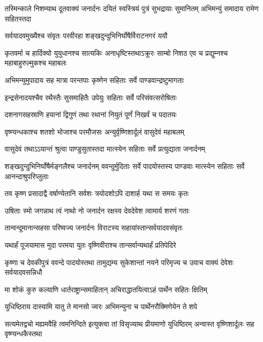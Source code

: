 \threelineshloka
{तस्मिन्काले निशम्याथ दूतवाक्यं जनार्दनः}
{दयितं स्वस्त्रियं पुत्रं सुभद्रायाः सुमानितम्}
{अभिमन्युं समादाय रामेण सहितस्तदा}


\twolineshloka
{सर्वयादवमुख्यैश्च संवृतः परवीरहा}
{शङ्खदुन्दुभिनिर्घोषैर्विराटनगरं ययौ}


\threelineshloka
{कृतवर्मा च हार्दिक्यो युयुधानश्च सात्यकिः}
{अनाधृष्टिस्तथाऽक्रूरः साम्बो निशठ एव च}
{प्रद्युम्नश्च महाबाहुरुल्मुकश्च महाबलः}


\twolineshloka
{अभिमन्युमुपादाय सह मात्रा परन्तपाः}
{कृष्णेन सहिताः सर्वे पाण्डवान्द्रष्टुमागताः}


\twolineshloka
{इन्द्रसेनादयश्चैव रथैस्तैः सुसमाहितैः}
{उपेयुः सहिताः सर्वे परिसंवत्सरोषिताः}


\twolineshloka
{दशनागसहस्राणि हयानां द्विगुणं तथा}
{रथानां नियुतं पूर्णं निखर्वं च पदातयः}


\twolineshloka
{वृष्ण्यन्धकाश्च शतशो भोजाश्च परमौजसः}
{अन्युर्वृष्णिशार्दूलं वासुदेवं महाबलम्}


\twolineshloka
{वासुदेवं तथाऽऽयान्तं श्रुत्वा पाण्डुसुतास्तदा}
{मात्स्येन सहिताः सर्वे प्रत्युद्याता जनार्दनम्}


\threelineshloka
{शङ्खदुन्दुभिनिर्घोषैर्मङ्गलैश्च जनार्दनम्}
{ववन्दुर्मुदिताः सर्वे पादयोस्तस्य पाण्डवाः}
{मात्स्येन सहिताः सर्वे आनन्दाश्रुपरिप्लुताः}


\twolineshloka
{तव कृष्ण प्रसादाद्वै वर्षाण्येतानि सर्वशः}
{त्रयोदशोऽपि दाशार्ह यथा स समयः कृतः}


\twolineshloka
{उषिताः स्मो जगन्नाथ त्वं नाथो नो जनार्दन}
{रक्षस्व देवदेवेश त्वामार्य शरणं गताः}



\twolineshloka
{तान्वन्दूमानान्सहसा परिष्वज्य जनार्दनः}
{विराटस्य सहायांस्तान्सर्वयादवसंवृतः}


\twolineshloka
{यथार्हं पूजयामास मुदा परमया युतः}
{वृष्णिवीराश्च तान्सर्वान्यथार्हं प्रतिपेदिरे}


\threelineshloka
{कृष्णा च देवकीपुत्रं ववन्दे पादयोस्तथा}
{तामुद्यम्य सुकेशान्तां नयने परिमृज्य च}
{उवाच वाक्यं देवेशः सर्वयादवसन्निधौ}


\twolineshloka
{मा शोकं कुरु कल्याणि धार्तराष्ट्रान्समाहितान्}
{अचिराद्धातयित्वाऽहं पार्थेन सहितः क्षितिम्}


\twolineshloka
{युधिष्ठिराय दास्यामि यातु ते मानसो ज्वरः}
{अभिमन्युना च पार्थेनरौक्मिणेयेन ते शपे}


\threelineshloka
{सत्यमेतद्वचो मह्यमवैहि त्वमनिन्दिते}
{इत्युक्त्वा तां विसृज्याथ प्रीयमाणो युधिष्ठिरम्}
{अन्वास्त वृष्णिशार्दूलः सह वृष्ण्यन्धकैस्तथा}


